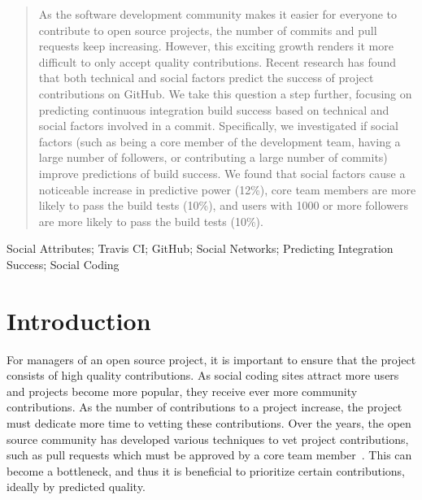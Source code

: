 \documentclass[10pt, conference]{IEEEtran}
\begin{document}




\maketitle


\begin{abstract}
As the software development community makes it easier for everyone
to contribute to open source projects, the number of commits and pull requests 	
keep increasing. However, this exciting growth
renders it more difficult to only accept quality contributions.
Recent research has found 
that both technical and social factors predict
the success of project contributions on GitHub.  
We take this question a step further, focusing on predicting continuous
integration build success based on technical and
social factors involved in a commit.
Specifically, we investigated if social factors (such as being a
core member of the development team, having a large number of followers,
or contributing a large number of commits) improve predictions of build
success.  We found that social factors cause a noticeable increase
in predictive power (12\%), core team members are more likely to pass the build
tests (10\%), and users with 1000 or more followers are more likely to
pass the build tests (10\%).
\end{abstract}

\begin{IEEEkeywords}
Social Attributes; Travis CI; GitHub; Social Networks; Predicting Integration 
Success; Social Coding
\end{IEEEkeywords}


%
\IEEEpeerreviewmaketitle



\section{Introduction}
For managers of an open source project, it is important to ensure that the
project consists of high quality contributions.  As social coding sites attract
more users and projects become more popular, they receive ever more
community contributions.  As the number of contributions to a project increase,
the project must dedicate more time to vetting these contributions. 
%
Over the years, the open source
community has developed various techniques to vet project contributions, such as pull
requests which must be approved by a core team member~\cite{gousios14}. 
This can become a bottleneck, and thus it is beneficial to prioritize certain
contributions, ideally by predicted quality.
\end{document}

